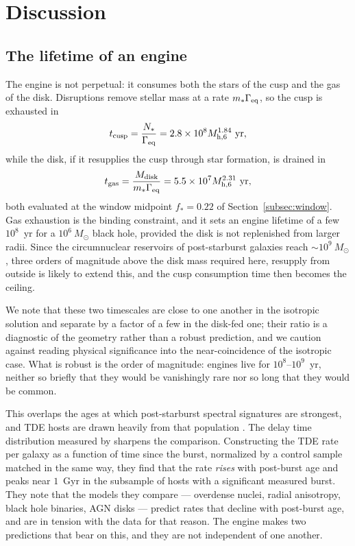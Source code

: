 \documentclass[preprint2]{aastex}
\newcommand{\msun}{M_{\odot}\xspace}
\newcommand{\mhsix}{M_{\rm h,6}\xspace}
\begin{document}
\section{Discussion}\label{sec:discussion}


\subsection{The lifetime of an engine}\label{subsec:lifetime}

The engine is not perpetual: it consumes both the stars of the cusp and the gas of the disk. Disruptions remove stellar mass at a rate $m_{\ast}\Gamma_{\rm eq}$, so the cusp is exhausted in
\begin{equation}
t_{\rm cusp} = \frac{N_{\ast}}{\Gamma_{\rm eq}} = 2.8 \times 10^{8} \mhsix^{1.84}~{\rm yr},
\end{equation}
while the disk, if it resupplies the cusp through star formation, is drained in
\begin{equation}
t_{\rm gas} = \frac{M_{\rm disk}}{m_{\ast} \Gamma_{\rm eq}} = 5.5 \times 10^{7} \mhsix^{2.31}~{\rm yr},
\end{equation}
both evaluated at the window midpoint $f_{\ast} = 0.22$ of Section~\ref{subsec:window}. Gas exhaustion is the binding constraint, and it sets an engine lifetime of a few $10^{8}$~yr for a $10^{6}~\msun$ black hole, provided the disk is not replenished from larger radii. Since the circumnuclear reservoirs of post-starburst galaxies reach $\sim 10^{9}~\msun$, three orders of magnitude above the disk mass required here, resupply from outside is likely to extend this, and the cusp consumption time then becomes the ceiling.

We note that these two timescales are close to one another in the isotropic solution and separate by a factor of a few in the disk-fed one; their ratio is a diagnostic of the geometry rather than a robust prediction, and we caution against reading physical significance into the near-coincidence of the isotropic case. What is robust is the order of magnitude: engines live for $10^{8}$--$10^{9}$~yr, neither so briefly that they would be vanishingly rare nor so long that they would be common.

This overlaps the ages at which post-starburst spectral signatures are strongest, and TDE hosts are drawn heavily from that population \citep{French:2020a,Hammerstein:2023a}. The delay time distribution measured by \citet{Shepherd:2026a} sharpens the comparison. Constructing the TDE rate per galaxy as a function of time since the burst, normalized by a control sample matched in the same way, they find that the rate {\it rises} with post-burst age and peaks near $1$~Gyr in the subsample of hosts with a significant measured burst. They note that the models they compare --- overdense nuclei, radial anisotropy, black hole binaries, AGN disks --- predict rates that decline with post-burst age, and are in tension with the data for that reason. The engine makes two predictions that bear on this, and they are not independent of one another.
\end{document}

